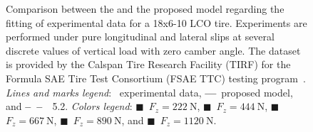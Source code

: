 \begin{figure}[htb]
\begin{minipage}[c]{0.29\linewidth}
  \end{minipage}
  \caption{Comparison between the \MagicFormulae{} and the proposed model regarding the fitting of experimental data for a \Hoosier{} 18x6-10 LCO tire. Experiments are performed under pure longitudinal and lateral slips at several discrete values of vertical load with zero camber angle. The dataset is provided by the Calspan Tire Research Facility (TIRF) for the Formula SAE Tire Test Consortium (FSAE TTC) testing program~\cite{kasprzak2006formula}. \emph{Lines and marks legend}: \textbullet~experimental data, \textbf{---}~proposed model, and \textbf{--~--}~\MagicFormulae{}~5.2. \emph{Colors legend}: \textcolor{mycolor1}{$\blacksquare$}~$F_z = \SI{222}{\newton}$, \textcolor{mycolor2}{$\blacksquare$}~$F_z = \SI{444}{\newton}$, \textcolor{mycolor3}{$\blacksquare$}~$F_z = \SI{667}{\newton}$, \textcolor{mycolor4}{$\blacksquare$}~$F_z = \SI{890}{\newton}$, and \textcolor{mycolor5}{$\blacksquare$}~$F_z = \SI{1120}{\newton}$.}
  \label{app3:fig:fsae_pure}
\end{figure}


